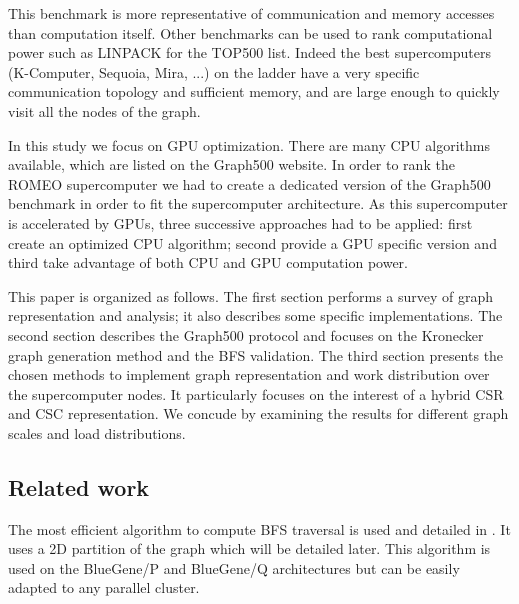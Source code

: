 This benchmark is more representative of communication and memory accesses than computation itself. 
Other benchmarks can be used to rank computational power such as LINPACK for the TOP500 list.
Indeed the best supercomputers (K-Computer, Sequoia, Mira, ...) on the ladder have a very specific communication topology and sufficient memory, and are large enough to quickly visit all the nodes of the graph. 

In this study we focus on GPU optimization. 
There are many CPU algorithms available, which are listed on the Graph500 website. 
In order to rank the ROMEO supercomputer we had to create a dedicated version of the Graph500 benchmark in order to fit the supercomputer architecture. 
As this supercomputer is accelerated by GPUs, three successive approaches had to be applied:  first create an optimized CPU algorithm; second provide a GPU specific version and third take advantage of both CPU and GPU computation power. 

This paper is organized as follows.
The first section performs a survey of graph representation and analysis; it also describes some specific implementations.
The second section  describes the Graph500 protocol and focuses on the Kronecker graph generation method and the BFS validation.
The third section presents the chosen methods to implement graph representation and work distribution over the supercomputer nodes. It particularly focuses on the interest of a hybrid CSR and CSC representation.
We concude by examining the results for different graph scales and load distributions.

\subsection{Related work}
The most efficient algorithm to compute BFS traversal is used and detailed in \cite{6468459}. 
It uses a 2D partition of the graph which will be detailed later. 
This algorithm is used on the BlueGene/P and BlueGene/Q architectures but can be easily adapted to any parallel cluster.


